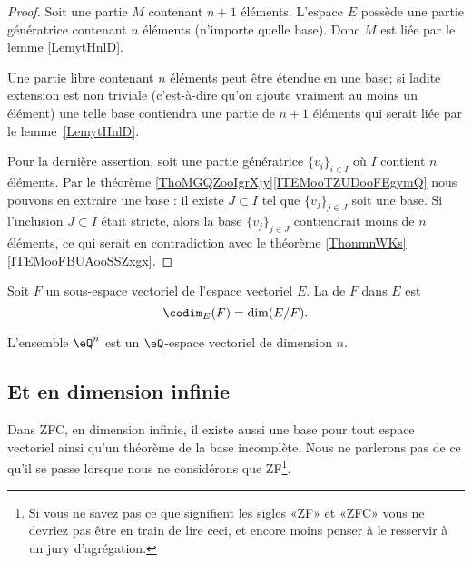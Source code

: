 \begin{proof}
	Soit une partie \( M\) contenant \( n+1\) éléments. L'espace \( E\) possède une partie génératrice contenant \( n\) éléments (n'importe quelle base). Donc \( M\) est liée par le lemme \ref{LemytHnlD}.

	Une partie libre contenant \( n\) éléments peut être étendue en une base; si ladite extension est non triviale (c'est-à-dire qu'on ajoute vraiment au moins un élément) une telle base contiendra une partie de \( n+1\) éléments qui serait liée par le lemme~\ref{LemytHnlD}.

	Pour la dernière assertion, soit une partie génératrice \( \{ v_i \}_{i\in I}\) où \( I\) contient \( n\) éléments. Par le théorème \ref{ThoMGQZooIgrXjy}\ref{ITEMooTZUDooFEgymQ} nous pouvons en extraire une base : il existe \( J\subset I\) tel que \( \{ v_j \}_{j\in J}\) soit une base. Si l'inclusion \( J\subset I\) était stricte, alors la base \( \{ v_j \}_{j\in J}\) contiendrait moins de \( n\) éléments, ce qui serait en contradiction avec le théorème \ref{ThonmnWKs}\ref{ITEMooFBUAooSSZxgx}.
\end{proof}

\begin{definition}\label{DefCodimension}
	Soit \( F\) un sous-espace vectoriel de l'espace vectoriel \( E\). La  de \( F\) dans \( E\) est
	\begin{equation}
		\codim_E(F)=\dim(E/F).
	\end{equation}
\end{definition}

\begin{lemma}		\label{LEMooGNDPooAhvIek}
	L'ensemble \( \eQ^n\) est un \( \eQ\)-espace vectoriel de dimension \( n\).
\end{lemma}

\subsection{Et en dimension infinie}

Dans ZFC, en dimension infinie, il existe aussi une base pour tout espace vectoriel ainsi qu'un théorème de la base incomplète. Nous ne parlerons pas de ce qu'il se passe lorsque nous ne considérons que ZF\footnote{Si vous ne savez pas ce que signifient les sigles «ZF» et «ZFC» vous ne devriez pas être en train de lire ceci, et encore moins penser à le resservir à un jury d'agrégation.}.

